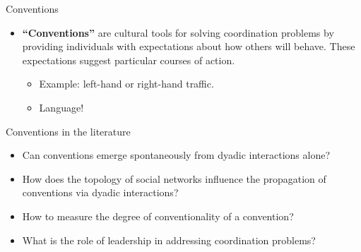 \documentclass[10pt]{beamer}
\begin{document}
\begin{frame}{Conventions}
\begin{itemize}
        \item<4-> \textbf{``Conventions''} are cultural tools for solving coordination problems by providing individuals with expectations about how others will behave. These expectations suggest particular courses of action.
        \begin{itemize}
            \item<5-> Example: left-hand or right-hand traffic.
            \item<6-> Language!
        \end{itemize}
    \end{itemize}
\end{frame}

\begin{frame}{Conventions in the literature}
\begin{itemize}
    \item Can conventions emerge spontaneously from dyadic interactions alone? \citep{Centola2015,hawkins2019emergence}
    \item How does the topology of social networks influence the propagation of conventions via dyadic interactions? \citep{pujol2005role,delgado2002emergence}
    \item How to measure the degree of conventionality of a convention? \citep{OConnor2020}
    \item What is the role of leadership in addressing coordination problems? \citep{calvert1992leadership}
\end{itemize}
\end{frame}
\end{document}
